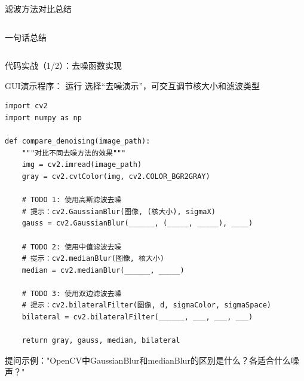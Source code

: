 \begin{frame}{滤波方法对比总结}
\begin{columns}
		\vspace{0.2cm}
		\begin{block}{一句话总结}
		\end{block}
	\end{columns}
\end{frame}

\begin{frame}[fragile]{代码实战（1/2）：去噪函数实现}
	\begin{alertblock}{GUI演示程序：}
		运行  选择“去噪演示”，可交互调节核大小和滤波类型
	\end{alertblock}

	\begin{lstlisting}[title={实现 compare\_denoising() 函数}]
import cv2
import numpy as np

def compare_denoising(image_path):
    """对比不同去噪方法的效果"""
    img = cv2.imread(image_path)
    gray = cv2.cvtColor(img, cv2.COLOR_BGR2GRAY)

    # TODO 1: 使用高斯滤波去噪
    # 提示：cv2.GaussianBlur(图像, (核大小), sigmaX)
    gauss = cv2.GaussianBlur(______, (_____, _____), ____)

    # TODO 2: 使用中值滤波去噪
    # 提示：cv2.medianBlur(图像, 核大小)
    median = cv2.medianBlur(______, _____)

    # TODO 3: 使用双边滤波去噪
    # 提示：cv2.bilateralFilter(图像, d, sigmaColor, sigmaSpace)
    bilateral = cv2.bilateralFilter(______, ___, ___, ___)

    return gray, gauss, median, bilateral
	\end{lstlisting}

	\vspace{0.2cm}
	\begin{tcolorbox}[colback=blue!5!white,colframe=blue!50!black,title=\textbf{AI辅助提示}]
		\small
		提问示例："OpenCV中GaussianBlur和medianBlur的区别是什么？各适合什么噪声？"
	\end{tcolorbox}
\end{frame}

